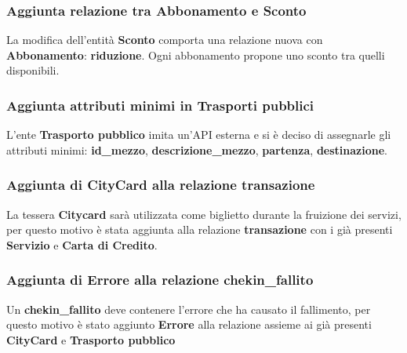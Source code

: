 \subsubsection{Aggiunta relazione tra Abbonamento e Sconto}
La modifica dell'entità \textbf{Sconto} comporta una relazione nuova con \textbf{Abbonamento}: \textbf{riduzione}. Ogni abbonamento propone uno sconto tra quelli disponibili.

\subsubsection{Aggiunta attributi minimi in Trasporti pubblici}
L'ente \textbf{Trasporto pubblico} imita un'API esterna e si è deciso di assegnarle gli attributi minimi: \textbf{id{\_}mezzo}, \textbf{descrizione{\_}mezzo}, \textbf{partenza}, \textbf{destinazione}.

\subsubsection{Aggiunta di \textbf{CityCard} alla relazione \textbf{transazione}}
La tessera \textbf{Citycard} sarà utilizzata come biglietto durante la fruizione dei servizi, per questo motivo è stata aggiunta alla relazione \textbf{transazione} con i già presenti \textbf{Servizio} e \textbf{Carta di Credito}.

\subsubsection{Aggiunta di \textbf{Errore} alla relazione \textbf{chekin{\_}fallito}}
Un \textbf{chekin{\_}fallito} deve contenere l'errore che ha causato il fallimento, per questo motivo è stato aggiunto \textbf{Errore} alla relazione assieme ai già presenti \textbf{CityCard} e \textbf{Trasporto pubblico}